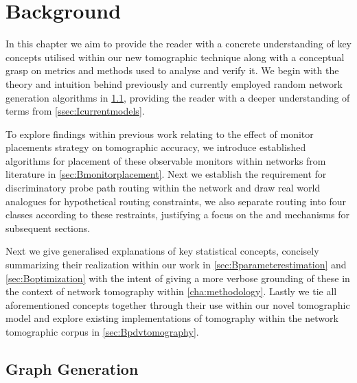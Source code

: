 \chapter{Background}
\label{cha:background}

In this chapter we aim to provide the reader with a concrete understanding of key concepts utilised within our new tomographic technique along with a conceptual grasp on metrics and methods used to analyse and verify it. We begin with the theory and intuition behind previously and currently employed random network generation algorithms in \cref{sec:Bgraphgeneration}, providing the reader with a deeper understanding of terms from \cref{ssec:Icurrentmodels}.\par
To explore findings within previous work relating to the effect of monitor placements strategy on tomographic accuracy, we introduce established algorithms for placement of these observable monitors within networks from literature in \cref{sec:Bmonitorplacement}. Next we establish the requirement for discriminatory probe path routing within the network and draw real world analogues for hypothetical routing constraints, we also separate routing into four classes according to these restraints, justifying a focus on the \cbr and \cfr mechanisms for subsequent sections.\par
Next we give generalised explanations of key statistical concepts, concisely summarizing their realization within our work in \cref{sec:Bparameterestimation} and \cref{sec:Boptimization} with the intent of giving a more verbose grounding of these in the context of network tomography within \cref{cha:methodology}. Lastly we tie all aforementioned concepts together through their use within our novel tomographic model and explore existing implementations of \pdv tomography within the network tomographic corpus in \cref{sec:Bpdvtomography}.

\section{Graph Generation}
\label{sec:Bgraphgeneration}

